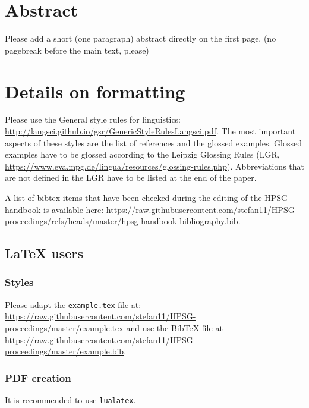 \documentclass[11pt,a4paper,fleqn]{article}
\begin{document}
\section{Abstract}

Please add a short (one paragraph) abstract directly on the first page.
(no pagebreak before the main text, please)


\section{Details on formatting}

Please use the General style rules for linguistics:
\url{http://langsci.github.io/gsr/GenericStyleRulesLangsci.pdf}. The most important aspects of these
styles are the list of references and the glossed examples. Glossed examples have to be glossed
according to the Leipzig Glossing Rules (LGR,
\url{https://www.eva.mpg.de/lingua/resources/glossing-rules.php}). Abbreviations that are not
defined in the LGR have to be listed at the end of the paper.

A list of bibtex items that have been checked during the editing of the HPSG handbook is available
here: \url{https://raw.githubusercontent.com/stefan11/HPSG-proceedings/refs/heads/master/hpsg-handbook-bibliography.bib}.

\subsection{\LaTeX{} users}

\subsubsection{Styles}

Please adapt the \verb+example.tex+ file at:\newline
\url{https://raw.githubusercontent.com/stefan11/HPSG-proceedings/master/example.tex}\newline
and use the BibTeX file at \url{https://raw.githubusercontent.com/stefan11/HPSG-proceedings/master/example.bib}.

\subsubsection{PDF creation}

It is recommended to use \verb+lualatex+. 
%
%
\end{document}
